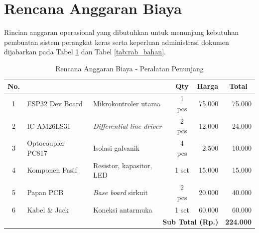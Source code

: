\section{Rencana Anggaran Biaya}
Rincian anggaran operasional yang dibutuhkan untuk menunjang kebutuhan pembuatan
sistem perangkat keras serta keperluan administrasi dokumen dijabarkan pada
Tabel \ref{tab:rab_alat} dan Tabel \ref{tab:rab_bahan}.

\begin{table}[htbp]
\centering
\caption{Rencana Anggaran Biaya - Peralatan Penunjang}
\label{tab:rab_alat}
\begin{tabular}{|c|>{\raggedright\arraybackslash}p{3cm}|>{\raggedright\arraybackslash}p{3.5cm}|c|r|r|} %
\hline
\textbf{No.} & \multicolumn{1}{c|}{\textbf{Material}} & \multicolumn{1}{c|}{\textbf{Justifikasi Pemakaian}} & \textbf{Qty} & \multicolumn{1}{c|}{\textbf{Harga}} & \multicolumn{1}{c|}{\textbf{Total}} \\ \hline
1 & ESP32 Dev Board & Mikrokontroler utama & 1 pcs & 75.000 & 75.000 \\ \hline
2 & IC AM26LS31 & \textit{Differential line driver} & 2 pcs & 12.000 & 24.000 \\ \hline
3 & Optocoupler PC817 & Isolasi galvanik & 4 pcs & 2.500 & 10.000 \\ \hline
4 & Komponen Pasif & Resistor, kapasitor, LED & 1 set & 15.000 & 15.000 \\ \hline
5 & Papan PCB & \textit{Base board} sirkuit & 2 pcs & 20.000 & 40.000 \\ \hline
6 & Kabel \& Jack & Koneksi antarmuka & 1 set & 60.000 & 60.000 \\ \hline
\multicolumn{5}{|r|}{\textbf{Sub Total (Rp.)}} & \textbf{224.000} \\ \hline
\end{tabular}
\end{table}

